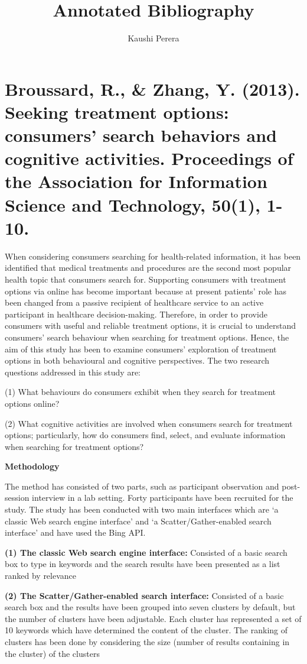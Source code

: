 \documentclass[]{article}
\title{Annotated Bibliography}
\author{Kaushi Perera}
\begin{document}
	
\maketitle

\section{Broussard, R., \& Zhang, Y. (2013). Seeking treatment options: consumers' search behaviors and cognitive activities. Proceedings of the Association for Information Science and Technology, 50(1), 1-10.} 

When considering consumers searching for health-related information, it has been identified that medical treatments and procedures are the second most popular health topic that consumers search for. Supporting consumers with treatment options via online has become important because at present patients’ role has been changed from a passive recipient of healthcare service to an active participant in healthcare decision-making. Therefore, in order to provide consumers with useful and reliable treatment options, it is crucial to understand consumers’ search behaviour when searching for treatment options. Hence, the aim of this study has been to examine consumers’ exploration of treatment options in both behavioural and cognitive perspectives. The two research questions addressed in this study are:

(1)	What behaviours do consumers exhibit when they search for treatment options online? 

(2)  What cognitive activities are involved when consumers search for treatment options; particularly, how do consumers find, select, and evaluate information when searching for treatment options? 


\textbf{Methodology}

The method has consisted of two parts, such as participant observation and post-session interview in a lab setting. Forty participants have been recruited for the study. The study has been conducted with two main interfaces which are ‘a classic Web search engine interface’ and ‘a Scatter/Gather-enabled search interface’ and have used the Bing API.  

\textbf{(1)	The classic Web search engine interface:} Consisted of a basic search box to type in keywords and the search results have been presented as a list ranked by relevance

\textbf{(2)	The Scatter/Gather-enabled search interface:} Consisted of a basic search box and the results have been grouped into seven clusters by default, but the number of clusters have been adjustable. Each cluster has represented a set of 10 keywords which have determined the content of the cluster. The ranking of clusters has been done by considering the size (number of results containing in the cluster) of the clusters  
\end{document}
